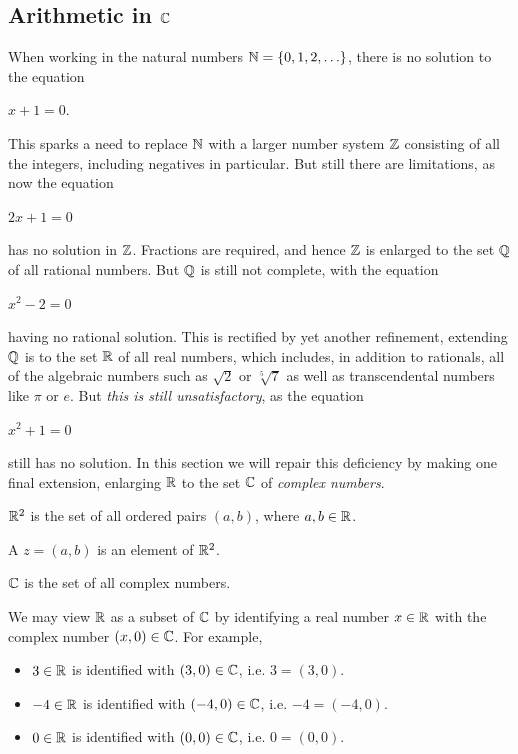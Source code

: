 \documentclass[11pt,fleqn,dvipsnames,usenames]{article}
\newcommand{\p}{\noindent}
\begin{document}
\subsection{Arithmetic in \texorpdfstring{$\mathbb{C}$}{C}}

\p When working in the natural numbers $\mathbb{N} = \left\{0,1,2,\ldots\right\}$, there is no solution to the equation
\begin{center}
$x + 1 = 0$.
\end{center}
This sparks a need to replace $\mathbb{N}$ with a larger number system $\mathbb{Z}$ consisting of all the integers, including negatives in particular.  But still there are limitations, as now the equation
\begin{center}
$2x + 1 = 0$
\end{center}
has no solution in $\mathbb{Z}$.  Fractions are required, and hence $\mathbb{Z}$ is enlarged to the set $\mathbb{Q}$ of all rational numbers.  But $\mathbb{Q}$ is still not complete, with the equation
\begin{center}
$x^2 - 2 = 0$
\end{center}
having no rational solution.  This is rectified by yet another refinement, extending $\mathbb{Q}$ is to the set $\mathbb{R}$ of all real numbers, which includes, in addition to rationals, all of the algebraic numbers such as $\sqrt{2}$ or $\sqrt[5]{7}$ as well as transcendental numbers like $\pi$ or $e$.  But \emph{this is still unsatisfactory}, as the equation
\begin{center}
$x^2 + 1 = 0$
\end{center}
still has no solution.  In this section we will repair this deficiency by making one final extension, enlarging $\mathbb{R}$ to the set $\mathbb{C}$ of \emph{complex numbers}.
\vsp

\recall $\mathbb{R}^{2}$ is the set of all ordered pairs $(a,b)$, where $a,b\in\mathbb{R}$.

\begin{definition}
A  $z = (a,b)$ is an element of $\mathbb{R}^{2}$.
\end{definition}

\notation $\mathbb{C}$ is the set of all complex numbers.
\vsp

\begin{remark}
We may view $\mathbb{R}$ as a subset of $\mathbb{C}$ by identifying a real number $x\in\mathbb{R}$ with the complex number $(x,0)\in\mathbb{C}$.  For example,
\begin{itemize}
\item $3\in\mathbb{R}$ is identified with $(3,0)\in\mathbb{C}$, i.e. $3 = (3,0)$.
\item $-4\in\mathbb{R}$ is identified with $(-4,0)\in\mathbb{C}$, i.e. $-4 = (-4,0)$.
\item $0\in\mathbb{R}$ is identified with $(0,0)\in\mathbb{C}$, i.e. $0 = (0,0)$.
\end{itemize}
\end{remark}
\end{document}
